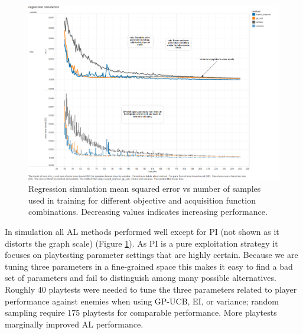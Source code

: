 \documentclass{sig-alternate}
\begin{document}
\begin{figure}[tbph]
\centering
\includegraphics[width=\linewidth]{regression_simulation}
\caption{Regression simulation mean squared error vs number of samples used in training for different objective and acquisition function combinations. Decreasing values indicates increasing performance.}
\label{fig:reg_sim}
\end{figure}
In simulation all AL methods performed well except for PI (not shown as it distorts the graph scale) (Figure \ref{fig:reg_sim}).
As PI is a pure exploitation strategy it focuses on playtesting parameter settings that are highly certain.
Because we are tuning three parameters in a fine-grained space this makes it easy to find a bad set of parameters and fail to distinguish among many possible alternatives.
%
%
Roughly 40 playtests were needed to tune the three parameters related to player performance against enemies when using GP-UCB, EI, or variance; random sampling require 175 playtests for comparable performance.
More playtests marginally improved AL performance.
\end{document}
